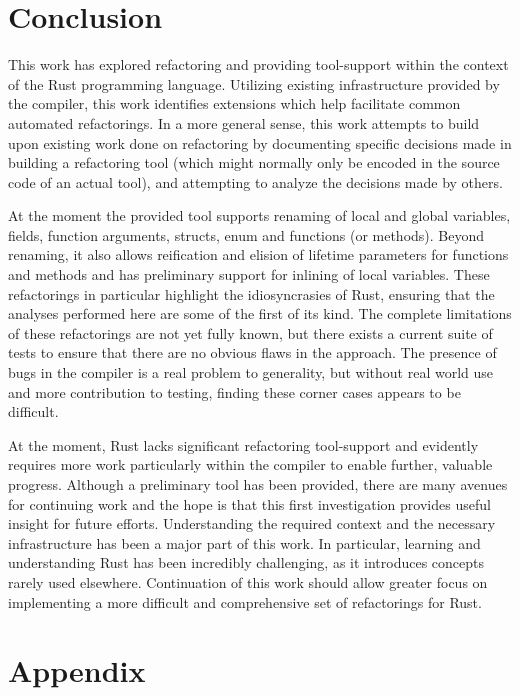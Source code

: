 \section{Conclusion}\label{C:con}
This work has explored refactoring and providing tool-support within the context of the Rust programming language. Utilizing existing infrastructure provided by the compiler, this work identifies extensions which help facilitate common automated refactorings. In a more general sense, this work attempts to build upon existing work done on refactoring by documenting specific decisions made in building a refactoring tool (which might normally only be encoded in the source code of an actual tool), and attempting to analyze the decisions made by others.


At the moment the provided tool supports renaming of local and global variables, fields, function arguments, structs, enum and functions (or methods). Beyond renaming, it also allows reification and elision of lifetime parameters for functions and methods and has preliminary support for inlining of local variables. These refactorings in particular highlight the idiosyncrasies of Rust, ensuring that the analyses performed here are some of the first of its kind. The complete limitations of these refactorings are not yet fully known, but there exists a current suite of tests to ensure that there are no obvious flaws in the approach. The presence of bugs in the compiler is a real problem to generality, but without real world use and more contribution to testing, finding these corner cases appears to be difficult.

At the moment, Rust lacks significant refactoring tool-support and evidently requires more work particularly within the compiler to enable further, valuable progress. Although a preliminary tool has been provided, there are many avenues for continuing work and the hope is that this first investigation provides useful insight for future efforts. Understanding the required context and the necessary infrastructure has been a major part of this work. In particular, learning and understanding Rust has been incredibly challenging, as it introduces concepts rarely used elsewhere. Continuation of this work should allow greater focus on implementing a more difficult and comprehensive set of refactorings for Rust.

\section{Appendix}\label{C:appen}
